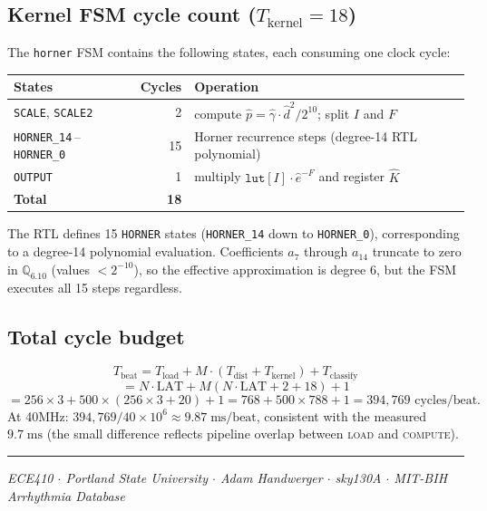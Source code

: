 \documentclass[11pt]{article}
\begin{document}
\subsection*{Kernel FSM cycle count (\(T_{\text{kernel}} = 18\))}

The \texttt{horner} FSM contains the following states, each consuming one
clock cycle:

\begin{center}
\begin{tabular}{lrl}
\toprule
\textbf{States} & \textbf{Cycles} & \textbf{Operation} \\
\midrule
\texttt{SCALE}, \texttt{SCALE2} & 2 & compute \(\hat{p} = \hat{\gamma}\cdot\hat{d}^2 / 2^{10}\); split \(I\) and \(F\) \\
\texttt{HORNER\_14}\,--\,\texttt{HORNER\_0} & 15 & Horner recurrence steps (degree-14 RTL polynomial) \\
\texttt{OUTPUT} & 1 & multiply \(\texttt{lut}[I] \cdot \hat{e}^{-F}\) and register \(\hat{K}\) \\
\midrule
\textbf{Total} & \textbf{18} & \\
\bottomrule
\end{tabular}
\end{center}

The RTL defines 15 \texttt{HORNER} states (\texttt{HORNER\_14} down to
\texttt{HORNER\_0}), corresponding to a degree-14 polynomial evaluation.
Coefficients \(a_{7}\) through \(a_{14}\) truncate to zero in
\(\mathbb{Q}_{6.10}\) (values \(< 2^{-10}\)), so the effective
approximation is degree 6, but the FSM executes all 15 steps regardless.

\subsection*{Total cycle budget}

\[
    T_{\text{beat}}
    = T_{\text{load}} + M \cdot \left( T_{\text{dist}} + T_{\text{kernel}} \right)
    + T_{\text{classify}}
\]
\[
    = N \cdot \text{LAT}
    + M \left( N \cdot \text{LAT} + 2 + 18 \right)
    + 1
\]
\[
    = 256 \times 3
    + 500 \times \left( 256 \times 3 + 20 \right)
    + 1
    = 768 + 500 \times 788 + 1
    = 394{,}769 \text{ cycles/beat}.
\]
At 40\;MHz: \(394{,}769 / 40 \times 10^{6} \approx 9.87\;\text{ms/beat}\),
consistent with the measured \(9.7\;\text{ms}\) (the small difference
reflects pipeline overlap between \textsc{load} and \textsc{compute}).

\vspace{1em}
\noindent\rule{\linewidth}{0.5pt}
{\small\itshape ECE410 $\cdot$ Portland State University $\cdot$
Adam Handwerger $\cdot$ sky130A $\cdot$ MIT-BIH Arrhythmia Database}
\end{document}
